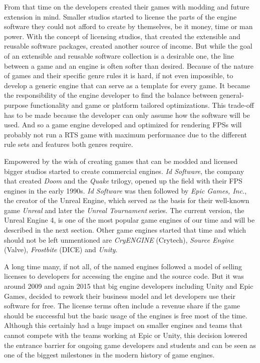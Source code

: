 From that time on the developers created their games with modding and future extension in mind. Smaller studios started to license the parts of the engine software they could not afford to create by themselves, be it money, time or man power. With the concept of licensing studios, that created the extensible and reusable software packages, created another source of income. But while the goal of an extensible and reusable software collection is a desirable one, the line between a game and an engine is often softer than desired. Because of the nature of games and their specific genre rules it is hard, if not even impossible, to develop a generic engine that can serve as a template for every game. It became the responsibility of the engine developer to find the balance between general-purpose functionality and game or platform tailored optimizations. This trade-off has to be made because the developer can only assume how the software will be used. And so a game engine developed and optimized for rendering \acp{FPS} will probably not run a \ac{RTS} game with maximum performance due to the different rule sets and features both genres require.

Empowered by the wish of creating games that can be modded and licensed bigger studios started to create commercial engines. \textit{Id Software}, the company that created \textit{Doom} and the \textit{Quake} trilogy, opened up the field with their \ac{FPS} engines in the early 1990s. \textit{Id Software} was then followed by \textit{Epic Games, Inc.}, the creator of the Unreal Engine, which served as the basis for their well-known game \textit{Unreal} and later the \textit{Unreal Tournament} series. The current version, the Unreal Engine 4, is one of the most popular game engines of our time and will be described in the next section. Other game engines started that time and which should not be left unmentioned are \textit{CryENGINE} (Crytech), \textit{Source Engine} (Valve), \textit{Frostbite} (DICE) and \textit{Unity}.

A long time many, if not all, of the named engines followed a model of selling licenses to developers for accessing the engine and the source code. But it was around 2009 and again 2015 that big engine developers including Unity and Epic Games, decided to rework their business model and let developers use their software for free. The license terms often include a revenue share if the game should be successful but the basic usage of the engines is free most of the time. Although this certainly had a huge impact on smaller engines and teams that cannot compete with the teams working at Epic or Unity, this decision lowered the entrance barrier for ongoing game developers and students and can be seen as one of the biggest milestones in the modern history of game engines.

